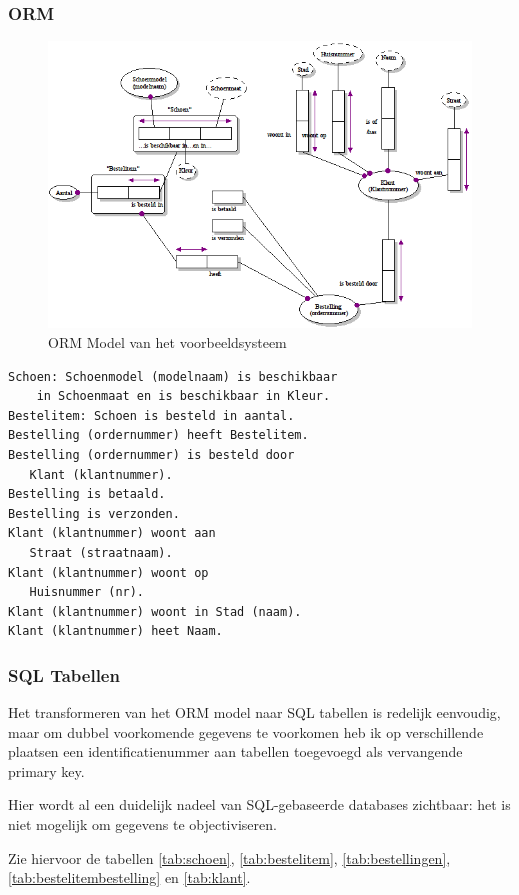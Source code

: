 \documentclass[11pt]{article}
\begin{document}
\subsubsection{ORM}
\begin{figure}[htp]
  \centering
  \includegraphics[keepaspectratio=true, width=345pt]{model1.png}
  \caption{ORM Model van het voorbeeldsysteem}
  \label{img:model1}
\end{figure}

\begin{verbatim}
Schoen: Schoenmodel (modelnaam) is beschikbaar
    in Schoenmaat en is beschikbaar in Kleur.
Bestelitem: Schoen is besteld in aantal.
Bestelling (ordernummer) heeft Bestelitem.
Bestelling (ordernummer) is besteld door 
   Klant (klantnummer).
Bestelling is betaald.
Bestelling is verzonden.
Klant (klantnummer) woont aan 
   Straat (straatnaam).
Klant (klantnummer) woont op 
   Huisnummer (nr).
Klant (klantnummer) woont in Stad (naam).
Klant (klantnummer) heet Naam.
\end{verbatim}

\subsubsection{SQL Tabellen}

Het transformeren van het ORM model naar SQL tabellen is redelijk 
eenvoudig, maar om dubbel voorkomende gegevens te voorkomen heb ik
op verschillende plaatsen een identificatienummer aan tabellen 
toegevoegd als vervangende primary key.

Hier wordt al een duidelijk nadeel van SQL-gebaseerde databases
zichtbaar: het is niet mogelijk om gegevens te objectiviseren.

Zie hiervoor de tabellen \ref{tab:schoen}, \ref{tab:bestelitem},
\ref{tab:bestellingen}, \ref{tab:bestelitembestelling} en \ref{tab:klant}.
\end{document}
